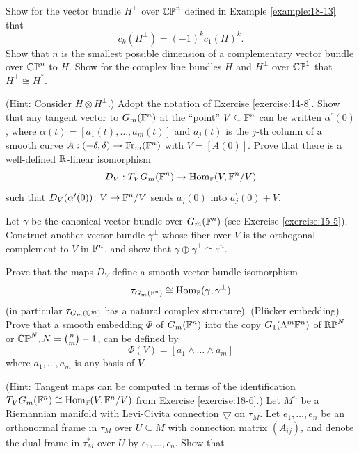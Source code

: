 \begin{enumerate}[label=\theexercise.\arabic*.,ref=\theexercise.\arabic*,leftmargin=2.7em]
  \NewItem Show for the vector bundle ${H}^{ \bot  }$ over ${\mathbb{{CP}}}^{n}$ defined in Example \ref{example:18-13} that
    \[
      {c}_{k}( {H}^{ \bot  })  = {(-1) }^{k}{c}_{1}{( H) }^{k}.
    \]
    Show that $n$ is the smallest possible dimension of a complementary vector bundle over ${\mathbb{{CP}}}^{n}$ to $H$.
  \NewItem Show for the complex line bundles $H$ and ${H}^{ \bot  }$ over ${\mathbb{{CP}}}^{1}$ that ${H}^{ \bot  } \cong  {H}^*$. \par(Hint: Consider $H \otimes  {H}^{ \bot  }$.)
  \NewItem Adopt the notation of Exercise \ref{exercise:14-8}. Show that any tangent vector to ${G}_{m}( {\mathbb{F}}^{n})$ at the ``point'' $V \subseteq  {\ensuremath{\mathbb{F}}}^{n}$ can be written ${\alpha }^{\prime }( 0)$, where $\alpha ( t)  = [  {{a}_{1}( t),\ldots,{a}_{m}( t) }]$ and ${a}_{j}( t)$ is the $j$-th column of a smooth curve $A : ( {-\delta,\delta })  \rightarrow  {\ensuremath{\mathrm{Fr}}}_{m}( {\mathbb{F}}^{n})$ with $V = [  {A( 0) }]$. Prove that there is a well-defined ${\mathbb{R}}$-linear isomorphism
    \[
      {D}_{V} : {T}_{V}{G}_{m}( {\mathbb{F}}^{n})  \rightarrow  {\ensuremath{\mathrm{Hom}}}_{\mathbb{F}}( {V,{\mathbb{F}}^{n}/V})
    \]
    such that ${D}_{V}( {{\alpha }^{\prime }( 0) })\colon V \rightarrow  {\ensuremath{\mathbb{F}}}^{n}/V$ sends ${a}_{j}( 0)$ into ${a}_{j}^{\prime }( 0)  + V$.\par
    Let $\gamma$ be the canonical vector bundle over ${G}_{m}( {\mathbb{F}}^{n})$ (see Exercise \ref{exercise:15-5}). Construct another vector bundle ${\gamma }^{ \bot  }$ whose fiber over $V$ is the orthogonal complement to $V$ in ${\mathbb{F}}^{n}$, and show that $\gamma  \oplus  {\gamma }^{ \bot  } \cong  {\varepsilon }^{n}$.\par
    Prove that the maps ${D}_{V}$ define a smooth vector bundle isomorphism
    \[
      {\tau }_{{G}_{m}( {\mathbb{F}}^{n}) } \cong  {\ensuremath{\mathrm{Hom}}}_{\mathbb{F}}( {\gamma,{\gamma }^{ \bot  }})
    \]
    (in particular ${\tau }_{{G}_{m}( {\mathbb{C}}^{m}) }$ has a natural complex structure).
  \NewItem (Pl\"ucker embedding) Prove that a smooth embedding $\Phi$ of ${G}_{m}( {\mathbb{F}}^{n})$ into the copy ${G}_{1}( {{\Lambda }^{m}{\mathbb{F}}^{n}})$ of ${\mathbb{{RP}}}^{N}$ or ${\mathbb{{CP}}}^{N},N = \binom{n}{m} - 1$, can be defined by
    \[
      \Phi ( V)  = [  {{a}_{1} \land  \ldots  \land  {a}_{m}}]
    \]
    where ${a}_{1},\ldots,{a}_{m}$ is any basis of $V$.
    \par(Hint: Tangent maps can be computed in terms of the identification ${T}_{V}{G}_{m}( {\mathbb{F}}^{n})  \cong  {\ensuremath{\mathrm{Hom}}}_{\mathbb{F}}( {V,{\mathbb{F}}^{n}/V})$ from Exercise \ref{exercise:18-6}.)
  \newchap[19]
  \NewItem Let ${M}^{n}$ be a Riemannian manifold with Levi-Civita connection $\bigtriangledown$ on ${\tau }_{M}$. Let ${e}_{1},\ldots,{e}_{n}$ be an orthonormal frame in ${\tau }_{M}$ over $U \subseteq  M$ with connection matrix $( {A}_{ij})$, and denote the dual frame in ${\tau }_{M}^*$ over $U$ by ${\epsilon }_{1},\ldots,{\epsilon }_{n}$. Show that

\end{enumerate}
